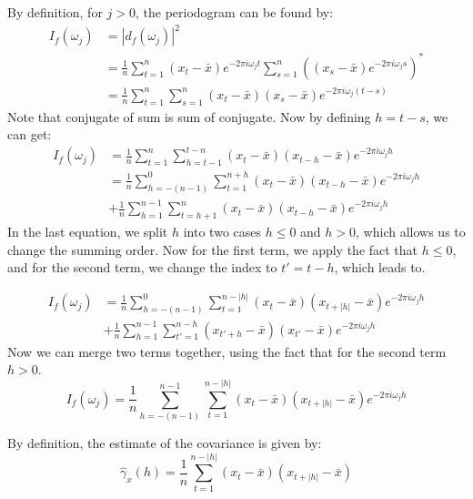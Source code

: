 By definition, for $j > 0$, the periodogram can be found by:
\begin{equation}
\begin{split}
I_f(\omega_j) &= |d_f(\omega_j)|^2 \\
&= \frac{1}{n} \sum_{t = 1}^{n} (x_t- \bar{x}) e^{-2\pi i \omega_j t} \sum_{s = 1}^{n} ((x_s - \bar{x})e^{-2\pi i \omega_j s})^* \\
&= \frac{1}{n} \sum_{t=1}^{n} \sum_{s=1}^{n} (x_t- \bar{x}) (x_s - \bar{x})e^{-2\pi i \omega_j (t-s)}
\end{split}
\end{equation}
Note that conjugate of sum is sum of conjugate. Now by defining $h = t-s$, we can get:
\begin{equation}
\begin{split}
I_f(\omega_j) &= \frac{1}{n} \sum_{t=1}^{n} \sum_{h=t-1}^{t-n} (x_t - \bar{x})(x_{t-h} - \bar{x})e^{-2\pi i \omega_j h}\\
&= \frac{1}{n} \sum_{h=-(n-1)}^{0}\sum_{t=1}^{n+h}(x_t - \bar{x})(x_{t-h} - \bar{x})e^{-2\pi i \omega_j h} \\
&+ \frac{1}{n}\sum_{h=1}^{n-1}\sum_{t=h+1}^{n}(x_t - \bar{x})(x_{t-h} - \bar{x})e^{-2\pi i \omega_j h}
\end{split}
\end{equation}
In the last equation, we split $h$ into two cases $h \leq 0$ and $h > 0$, which allows us to change the summing order. Now for the first term, we apply the fact that $h \leq 0$, and for the second term, we change the index to $t' = t - h$, which leads to.

\begin{equation}
\begin{split}
I_f(\omega_j) &= \frac{1}{n} \sum_{h=-(n-1)}^{0}\sum_{t=1}^{n-|h|}(x_t - \bar{x})(x_{t+|h|} - \bar{x})e^{-2\pi i \omega_j h} \\
&+ \frac{1}{n}\sum_{h=1}^{n-1}\sum_{t'=1}^{n-h}(x_{t'+h} - \bar{x})(x_{t'} - \bar{x})e^{-2\pi i \omega_j h}
\end{split}
\end{equation}
Now we can merge two terms together, using the fact that for the second term $h > 0$.
\begin{equation} \label{eq:periodogram_sample}
I_f(\omega_j) = \frac{1}{n} \sum_{h=-(n-1)}^{n-1}\sum_{t=1}^{n-|h|}(x_t - \bar{x})(x_{t+|h|} - \bar{x})e^{-2\pi i \omega_j h}
\end{equation}

By definition, the estimate of the covariance is given by:
\begin{equation}
\hat{\gamma}_x(h) = \frac{1}{n}\sum_{t=1}^{n-|h|}(x_t - \bar{x})(x_{t+|h|} - \bar{x})
\end{equation}

